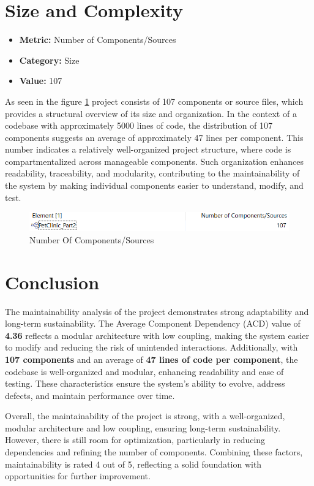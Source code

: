 \documentclass[a4paper,11pt,openright,BCOR=15mm]{scrbook}
\begin{document}
\section{Size and Complexity}
\begin{itemize}
    \item \textbf{Metric:} Number of Components/Sources
    \item \textbf{Category:} Size
    \item \textbf{Value:} 107
\end{itemize}
As seen in the figure \ref{fig:NumberOfComponentsSources} project consists of 107 components or source files, which provides a structural overview of its size and organization. In the context of a codebase with approximately 5000 lines of code, the distribution of 107 components suggests an average of approximately 47 lines per component. This number indicates a relatively well-organized project structure, where code is compartmentalized across manageable components. Such organization enhances readability, traceability, and modularity, contributing to the maintainability of the system by making individual components easier to understand, modify, and test.
\begin{figure}[H]
	\centering
	\includegraphics[width=\textwidth]{figs/Maintainability/Number of ComponentsSources.png}
	\caption{Number Of Components/Sources}
	\label{fig:NumberOfComponentsSources}
\end{figure}

\section{Conclusion}

The maintainability analysis of the project demonstrates strong adaptability and long-term sustainability. The Average Component Dependency (ACD) value of \textbf{4.36} reflects a modular architecture with low coupling, making the system easier to modify and reducing the risk of unintended interactions. Additionally, with \textbf{107 components} and an average of \textbf{47 lines of code per component}, the codebase is well-organized and modular, enhancing readability and ease of testing. These characteristics ensure the system's ability to evolve, address defects, and maintain performance over time.


Overall, the maintainability of the project is strong, with a well-organized, modular architecture and low coupling, ensuring long-term sustainability. However, there is still room for optimization, particularly in reducing dependencies and refining the number of components. Combining these factors, maintainability is rated 4 out of 5, reflecting a solid foundation with opportunities for further improvement.%
\end{document}
